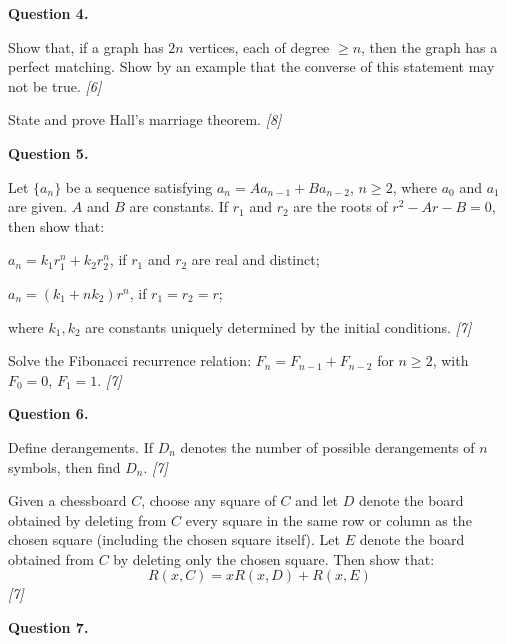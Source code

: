 \documentclass[11pt,a4paper]{article}
\newcommand{\pts}[1]{\hfill   \textit{[#1]}}
\begin{document}
\noindent   \textbf{Question 4.}

\begin{parts}
  \item Show that, if a graph has $2n$ vertices, each of degree $\ge n$, then the graph has a perfect matching. Show by an example that the converse of this statement may not be true. \pts{6}
  \item State and prove Hall's marriage theorem. \pts{8}
\end{parts}

\medskip


\noindent   \textbf{Question 5.}

\begin{parts}
  \item Let $\{a_n\}$ be a sequence satisfying $a_n = A a_{n-1} + B a_{n-2}$, $n \ge 2$, where $a_0$ and $a_1$ are given. $A$ and $B$ are constants. If $r_1$ and $r_2$ are the roots of $r^2 - Ar - B = 0$, then show that:
  
\begin{parts}
    \item $a_n = k_1 r_1^n + k_2 r_2^n$, if $r_1$ and $r_2$ are real and distinct;
    \item $a_n = (k_1 + n k_2)r^n$, if $r_1 = r_2 = r$;
  \end{parts}
  where $k_1, k_2$ are constants uniquely determined by the initial conditions. \pts{7}
  \item Solve the Fibonacci recurrence relation: $F_n = F_{n-1} + F_{n-2}$ for $n \ge 2$, with $F_0 = 0$, $F_1 = 1$. \pts{7}
\end{parts}

\medskip


\noindent   \textbf{Question 6.}

\begin{parts}
  \item Define derangements. If $D_n$ denotes the number of possible derangements of $n$ symbols, then find $D_n$. \pts{7}
  \item Given a chessboard $C$, choose any square of $C$ and let $D$ denote the board obtained by deleting from $C$ every square in the same row or column as the chosen square (including the chosen square itself). Let $E$ denote the board obtained from $C$ by deleting only the chosen square. Then show that:
  \[ R(x, C) = x R(x, D) + R(x, E) \] \pts{7}
\end{parts}

\medskip


\noindent   \textbf{Question 7.}
\end{document}
